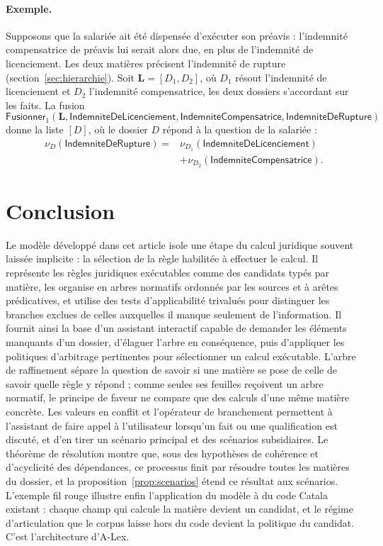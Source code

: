 \documentclass[review]{jflart}
\newcommand{\ALex}{A-Lex}
\newcommand{\Fusionner}{\ensuremath{\mathsf{Fusionner}}}
\newcommand{\Liste}{\ensuremath{\mathbf L}}
\newcommand{\ICP}{\ensuremath{\mathsf{IndemniteCompensatrice}}}
\newcommand{\IndemRupture}{\ensuremath{\mathsf{IndemniteDeRupture}}}
\renewcommand{\Indem}{\ensuremath{\mathsf{IndemniteDeLicenciement}}}
\begin{document}
\paragraph{Exemple.}
Supposons que la salariée ait été dispensée d'exécuter son préavis :
l'indemnité compensatrice de préavis lui serait alors due, en plus de
l'indemnité de licenciement. Les deux matières précisent l'indemnité de rupture
(section~\ref{sec:hierarchie}). Soit \(\Liste=[D_1,D_2]\), où \(D_1\) résout
l'indemnité de licenciement et \(D_2\) l'indemnité compensatrice, les deux
dossiers s'accordant sur les faits. La fusion
\[
\Fusionner_1(\Liste,\Indem,\ICP,\IndemRupture)
\]
donne la liste \([D]\), où le dossier \(D\) répond à la question de la
salariée :
\[
\begin{aligned}
\nu_D(\IndemRupture)={}&\nu_{D_1}(\Indem)\\
&+\nu_{D_2}(\ICP).
\end{aligned}
\]

\section{Conclusion}\label{sec:conclusion}

Le modèle développé dans cet article isole une étape du calcul juridique
souvent laissée implicite : la sélection de la règle habilitée à effectuer le
calcul. Il représente les règles juridiques exécutables comme des candidats
typés par matière, les organise en arbres normatifs ordonnés par les sources et
à arêtes prédicatives, et utilise des tests d'applicabilité trivalués pour
distinguer les branches exclues de celles auxquelles il manque seulement de
l'information. Il fournit ainsi la base d'un assistant interactif capable de
demander les éléments manquants d'un dossier, d'élaguer l'arbre en
conséquence, puis d'appliquer les politiques d'arbitrage pertinentes pour
sélectionner un calcul exécutable. L'arbre de raffinement sépare la
question de savoir si une matière se pose de celle de savoir quelle règle y
répond ; comme seules ses feuilles reçoivent un arbre normatif, le principe de
faveur ne compare que des calculs d'une même matière concrète. Les valeurs en conflit et l'opérateur de branchement
permettent à l'assistant de faire appel à l'utilisateur lorsqu'un fait ou une
qualification est discuté, et d'en tirer un scénario principal et des
scénarios subsidiaires. Le théorème de
résolution montre que, sous des hypothèses de cohérence et d'acyclicité des
dépendances, ce processus finit par résoudre toutes les matières du dossier, et
la proposition~\ref{prop:scenarios} étend ce résultat aux scénarios. L'exemple
fil rouge illustre enfin l'application du modèle à du code Catala existant :
chaque champ qui calcule la matière devient un candidat, et le régime
d'articulation que le corpus laisse hors du code devient la politique du
candidat. C'est
l'architecture d'\ALex{}.
\end{document}
